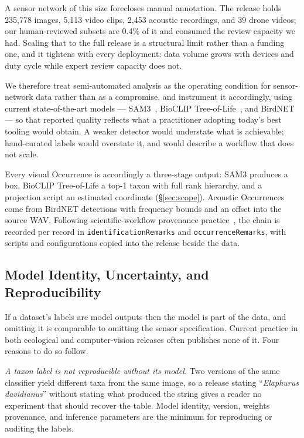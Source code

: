 \documentclass[sigconf]{acmart}
\begin{document}
A sensor network of this size forecloses manual annotation. The release
holds 235{,}778 images, 5{,}113 video clips, 2{,}453 acoustic
recordings, and 39 drone videos; our human-reviewed subsets are 0.4\% of
it and consumed the review capacity we had. Scaling that to the full
release is a structural limit rather than a funding one, and it tightens
with every deployment: data volume grows with devices and duty cycle
while expert review capacity does not.

We therefore treat semi-automated analysis as the operating condition
for sensor-network data rather than as a compromise, and instrument it
accordingly, using current state-of-the-art models ---
SAM3~\cite{carion2026sam}, BioCLIP
Tree-of-Life~\cite{stevens2024bioclip,gu2025bioclip,treeoflife_200m},
and BirdNET~\cite{kahl2021birdnet} --- so that reported quality reflects
what a practitioner adopting today's best tooling would obtain. A weaker
detector would understate what is achievable; hand-curated labels would
overstate it, and would describe a workflow that does not scale.

Every visual Occurrence is accordingly a three-stage output: SAM3
produces a box, BioCLIP Tree-of-Life a top-1 taxon with full rank
hierarchy, and a projection script an estimated coordinate
(\S\ref{sec:scope}). Acoustic Occurrences come from BirdNET detections
with frequency bounds and an offset into the source WAV. Following
scientific-workflow provenance practice~\cite{simmhan2005provenance}, the chain is
recorded per record in \texttt{identificationRemarks} and
\texttt{occurrenceRemarks}, with scripts and configurations copied into
the release beside the data.

\subsection{Model Identity, Uncertainty, and Reproducibility}
\label{sec:modelprov}

If a dataset's labels are model outputs then the model is part of the
data, and omitting it is comparable to omitting the sensor
specification. Current practice in both ecological and computer-vision
releases often publishes none of it. Four reasons to do so follow.

\emph{A taxon label is not reproducible without its model.} Two versions
of the same classifier yield different taxa from the same image, so a
release stating ``\emph{Elaphurus davidianus}'' without stating what
produced the string gives a reader no experiment that should recover the
table. Model identity, version, weights provenance, and inference
parameters are the minimum for reproducing or auditing the labels.
\end{document}
